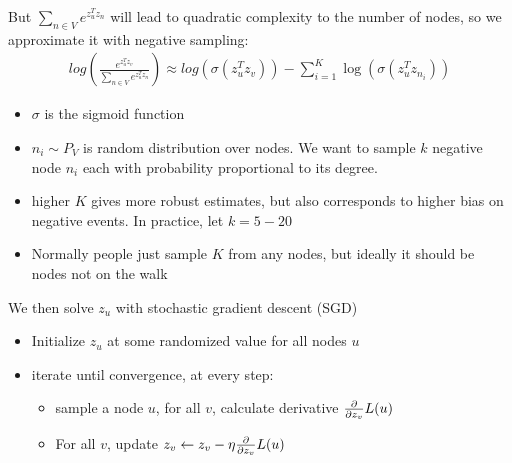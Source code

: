 But $\sum_{n\in V} e^{z_u^Tz_n}$ will lead to quadratic complexity to the number of nodes, so we approximate it with negative sampling: 
    \begin{align*}
        log( \frac{e^{z_u^Tz_v}}{\sum_{n\in V} e^{z_u^Tz_n}}) \approx log(\sigma(z_u^Tz_v)) - \sum_{i=1}^K \log(\sigma(z_u^Tz_{n_i}))
    \end{align*}
    \begin{itemize}
        \item $\sigma$ is the sigmoid function
        \item $n_i \sim P_V$ is random distribution over nodes. We want to sample $k$ negative node $n_i$ each with probability proportional to its degree. 
        \item higher $K$ gives more robust estimates, but also corresponds to higher bias on negative events. In practice, let $k = 5-20$
        \item Normally people just sample $K$ from any nodes, but ideally it should be nodes not on the walk
    \end{itemize}
We then solve $z_u$ with stochastic gradient descent (SGD)
    \begin{itemize}
        \item Initialize $z_u$ at some randomized value for all nodes $u$
        \item iterate until convergence, at every step: 
            \begin{itemize}
                \item sample a node $u$, for all $v$, calculate derivative $\frac{\partial}{\partial z_v}L(u)$
                \item For all $v$, update $z_v \leftarrow z_v - \eta \frac{\partial}{\partial z_v}L(u)$
            \end{itemize}
    \end{itemize}
    
